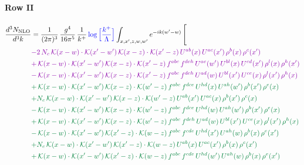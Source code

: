 \documentclass[10pt]{article}
\numberwithin{equation}{section}
\newcommand{\new}[1]{{\color{blue}#1}}
\begin{document}
\paragraph{Row II}
\begin{align}
\frac{d^{3}N_{\mathrm{NLO}}}{d^{3}k} & = \frac{1}{(2\pi)^{3}}\,\frac{g^{4}}{16\pi^{5}}\,\frac{1}{k^{+}}\,\new{\log\Big[\frac{k^{+}}{\Lambda}\Big]}\int_{x,x',z,w,w'}e^{-ik(w'-w)}\,\Bigg[\notag\\ &{\color{CC}  -2\,N_{c}\,\mathcal{K}(x-w)\cdot\mathcal{K}(x'-w')\,\mathcal{K}(x-z)\cdot\mathcal{K}(x'-z)\,U^{ab}(x)\,U^{ac}(x')\,\rho^{b}(x)\,\rho^{c}(x')} \notag\\
&{\color{CC} +\,\mathcal{K}(x-w)\cdot\mathcal{K}(x'-w')\,\mathcal{K}(x-z)\cdot\mathcal{K}(x'-z)\,f^{abc}\,f^{deh}\,U^{ae}(w')\,U^{bl}(x)\,U^{cd}(x')\,\rho^{l}(x)\,\rho^{h}(x')} \notag\\
&{\color{CC} -\,\mathcal{K}(x-w)\cdot\mathcal{K}(x'-w')\,\mathcal{K}(x-z)\cdot\mathcal{K}(x'-z)\,f^{abc}\,f^{deh}\,U^{ad}(w)\,U^{bl}(x')\,U^{ce}(x)\,\rho^{l}(x')\,\rho^{h}(x)} \notag\\
&{\color{JIM} +\,\mathcal{K}(x-w)\cdot\mathcal{K}(x'-w')\,\mathcal{K}(x-z)\cdot\mathcal{K}(w'-z)\,f^{abc}\,f^{dce}\,U^{hd}(x)\,U^{ah}(w')\,\rho^{b}(x')\,\rho^{e}(x)} \notag\\
&{\color{JIM} +N_{c}\,\mathcal{K}(x-w)\cdot\mathcal{K}(x'-w')\,\mathcal{K}(x-z)\cdot\mathcal{K}(w'-z)\,U^{ab}(x')\,U^{ac}(x)\,\rho^{b}(x')\,\rho^{c}(x)} \notag\\
&{\color{JIM} -\,\mathcal{K}(x-w)\cdot\mathcal{K}(x'-w')\,\mathcal{K}(x-z)\cdot\mathcal{K}(w'-z)\,f^{abc}\,f^{dce}\,U^{hd}(w)\,U^{ah}(w')\,\rho^{b}(x')\,\rho^{e}(x)} \notag\\
&{\color{JIM} +\,\mathcal{K}(x-w)\cdot\mathcal{K}(x'-w')\,\mathcal{K}(x-z)\cdot\mathcal{K}(w'-z)\,f^{abc}\,f^{deh}\,U^{ad}(w)\,U^{bl}(x')\,U^{ce}(x)\,\rho^{l}(x')\,\rho^{h}(x)} \notag\\
&{\color{JIM} -\,\mathcal{K}(x-w)\cdot\mathcal{K}(x'-w')\,\mathcal{K}(x'-z)\cdot\mathcal{K}(w-z)\,f^{abc}\,f^{cde}\,U^{hd}(x')\,U^{ah}(w)\,\rho^{b}(x)\,\rho^{e}(x')} \notag\\
&{\color{JIM} +N_{c}\,\mathcal{K}(x-w)\cdot\mathcal{K}(x'-w')\,\mathcal{K}(x'-z)\cdot\mathcal{K}(w-z)\,U^{ab}(x)\,U^{ac}(x')\,\rho^{b}(x)\,\rho^{c}(x')} \notag\\
&{\color{JIM} +\,\mathcal{K}(x-w)\cdot\mathcal{K}(x'-w')\,\mathcal{K}(x'-z)\cdot\mathcal{K}(w-z)\,f^{abc}\,f^{cde}\,U^{hd}(w')\,U^{ah}(w)\,\rho^{b}(x)\,\rho^{e}(x')} \notag\\

\end{align}
\end{document}
